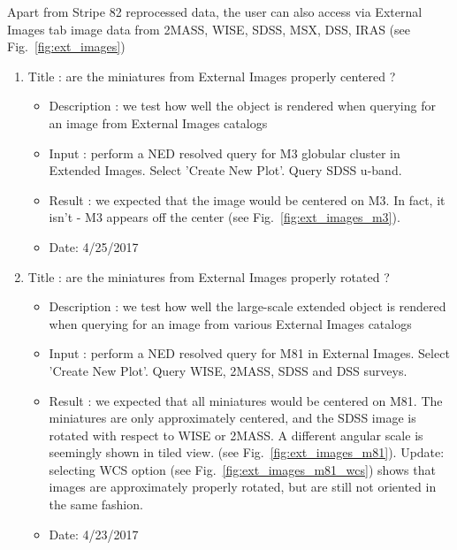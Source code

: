 \documentclass[DM,lsstdraft,toc,usenatbib]{lsstdoc}
\begin{document}
Apart from Stripe 82 reprocessed data, the user can also access  via External Images tab image data from 2MASS, WISE, SDSS, MSX, DSS, IRAS (see Fig.~\ref{fig:ext_images})

\begin{enumerate}
   \item Title : are the miniatures from External Images properly centered ?
    \begin{itemize}
      \item Description : we test how  well the object is rendered when querying for an image from External Images catalogs
      \item Input : perform a NED resolved  query  for M3 globular cluster  in Extended Images. Select  'Create  New Plot'.  Query SDSS   u-band. 
      \item Result : we expected that the image would be centered on M3. In fact, it isn't - M3 appears off the center (see Fig.~\ref{fig:ext_images_m3}).  
      \item Date: 4/25/2017
    \end{itemize}


    \item Title : are the miniatures from External Images properly rotated ?
    \begin{itemize}
      \item Description : we test how  well the large-scale extended object is rendered when querying for an image from various External Images catalogs
      \item Input : perform a NED resolved  query  for M81  in External Images. Select  'Create  New Plot'.  Query WISE, 2MASS, SDSS and DSS  surveys.
      \item Result : we expected that all miniatures would be centered on M81. The miniatures are only approximately centered, and the SDSS image is rotated with respect to WISE or 2MASS. A different angular scale is seemingly shown in tiled view. (see Fig.~\ref{fig:ext_images_m81}). Update: selecting WCS option (see Fig.~\ref{fig:ext_images_m81_wcs}) shows that images are approximately properly rotated, but are still not oriented in the same fashion.
      \item Date: 4/23/2017
    \end{itemize}


\end{enumerate}
\end{document}
